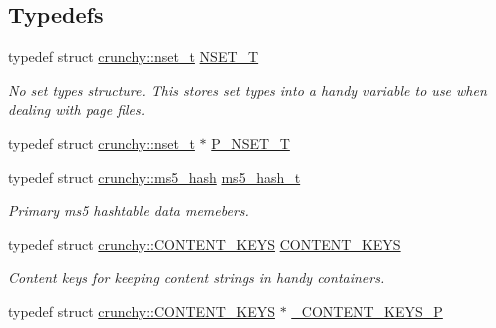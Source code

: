 \subsection*{Typedefs}
\begin{DoxyCompactItemize}
\item 
typedef struct \hyperlink{structcrunchy_1_1nset__t}{crunchy\+::nset\+\_\+t} \hyperlink{namespacecrunchy_a675701955bf4d2f3c9f02332aec33cc0}{N\+S\+E\+T\+\_\+\+T}
\begin{DoxyCompactList}\small\item\em No set types structure. This stores set types into a handy variable to use when dealing with page files. \end{DoxyCompactList}\item 
typedef struct \hyperlink{structcrunchy_1_1nset__t}{crunchy\+::nset\+\_\+t} $\ast$ \hyperlink{namespacecrunchy_ab958409ccb75be47eba557824d83fb0e}{P\+\_\+\+N\+S\+E\+T\+\_\+\+T}
\item 
typedef struct \hyperlink{structcrunchy_1_1ms5__hash}{crunchy\+::ms5\+\_\+hash} \hyperlink{namespacecrunchy_a21315e3a9026f19da3135447e60f8955}{ms5\+\_\+hash\+\_\+t}
\begin{DoxyCompactList}\small\item\em Primary ms5 hashtable data memebers. \end{DoxyCompactList}\item 
typedef struct \hyperlink{structcrunchy_1_1_c_o_n_t_e_n_t___k_e_y_s}{crunchy\+::\+C\+O\+N\+T\+E\+N\+T\+\_\+\+K\+E\+Y\+S} \hyperlink{namespacecrunchy_a6eff164c7bb3015fe59ea97d06ad97aa}{C\+O\+N\+T\+E\+N\+T\+\_\+\+K\+E\+Y\+S}
\begin{DoxyCompactList}\small\item\em Content keys for keeping content strings in handy containers. \end{DoxyCompactList}\item 
typedef struct \hyperlink{structcrunchy_1_1_c_o_n_t_e_n_t___k_e_y_s}{crunchy\+::\+C\+O\+N\+T\+E\+N\+T\+\_\+\+K\+E\+Y\+S} $\ast$ \hyperlink{namespacecrunchy_ae129fa6af952168d3ded4da75f1707c4}{\+\_\+\+C\+O\+N\+T\+E\+N\+T\+\_\+\+K\+E\+Y\+S\+\_\+\+P}
\end{DoxyCompactItemize}
